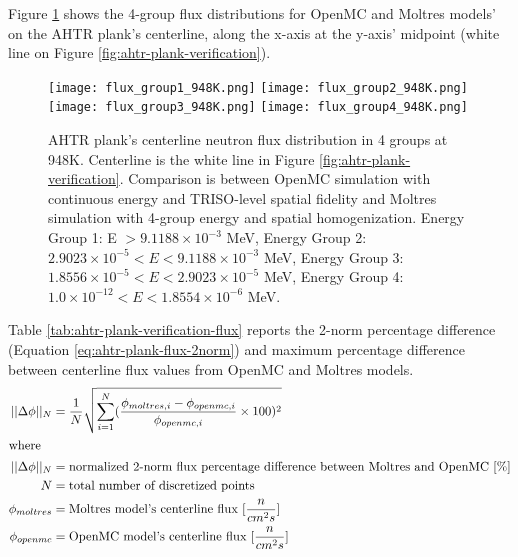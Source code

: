 Figure \ref{fig:flux_948K} shows the 4-group flux distributions for OpenMC and 
Moltres models' on the \gls{AHTR} plank's centerline, along the x-axis at the y-axis' 
midpoint (white line on Figure \ref{fig:ahtr-plank-verification}). 
\begin{figure}[htbp]
    \centering
    \texttt{[image: flux\_group1\_948K.png]} 
    \texttt{[image: flux\_group2\_948K.png]} 
    \texttt{[image: flux\_group3\_948K.png]} 
    \texttt{[image: flux\_group4\_948K.png]} 
    \caption{\acrfull{AHTR} plank's centerline neutron flux distribution 
    in 4 groups at 948K. 
    Centerline is the white line in Figure \ref{fig:ahtr-plank-verification}.
    Comparison is between OpenMC simulation with continuous energy 
    and TRISO-level spatial fidelity and Moltres simulation with 4-group energy and 
    spatial homogenization.  
    Energy Group 1: E $> 9.1188 \times 10^{-3}$ MeV, 
    Energy Group 2: $2.9023 \times 10^{-5} < E < 9.1188 \times 10^{-3}$ MeV,
    Energy Group 3:  $1.8556 \times 10^{-5} < E < 2.9023 \times 10^{-5}$ MeV,
    Energy Group 4:  $1.0 \times 10^{-12} < E < 1.8554 \times 10^{-6}$ MeV.}
    \label{fig:flux_948K}
\end{figure}
Table \ref{tab:ahtr-plank-verification-flux} reports the 2-norm percentage difference 
(Equation \ref{eq:ahtr-plank-flux-2norm}) and maximum percentage difference between 
centerline flux values from OpenMC and Moltres models. 
\begin{align}
    \label{eq:ahtr-plank-flux-2norm}
    ||\Delta \phi||_N &= \frac{1}{N}\sqrt{\sum_{i=1}^N(\frac{\phi_{moltres, i} - \phi_{openmc, i}}{\phi_{openmc, i}}\times100)^2} \\
\intertext{where}
    ||\Delta \phi||_N &= \mbox{normalized 2-norm flux percentage difference between Moltres and OpenMC } [\%] \nonumber \\
    N &= \mbox{total number of discretized points} \nonumber \\
    \phi_{moltres} &= \mbox{Moltres model's centerline flux } [\frac{n}{cm^2s}] \nonumber \\
    \phi_{openmc} &= \mbox{OpenMC model's centerline flux } [\frac{n}{cm^2s}] \nonumber 
\end{align} 
